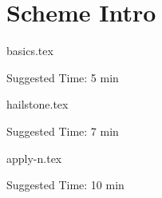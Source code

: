 \documentclass{exam}
\begin{document}
\section{Scheme Intro}
\begin{questions}
    {basics.tex}
    \begin{questionmeta}
        Suggested Time: 5 min
    \end{questionmeta}

    {hailstone.tex}
    \begin{questionmeta}
        Suggested Time: 7 min
    \end{questionmeta}


    {apply-n.tex}
    \begin{questionmeta}
        Suggested Time: 10 min
    \end{questionmeta}
\end{questions}
\end{document}
